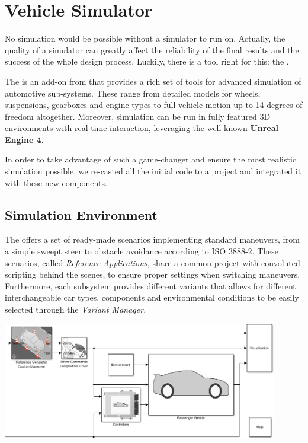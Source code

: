 
\chapter{Vehicle Simulator}

No simulation would be possible without a simulator to run on.
Actually, the quality of a simulator can greatly affect the reliability of the final results and the success of the whole design process.
Luckily, there is a tool right for this: the \textbf{\mwVDB\texttrademark}.

The \mwVDB{} is an add-on from \mwMW{} that provides a rich set of tools for advanced simulation of automotive sub-systems.
These range from detailed models for wheels, suspensions, gearboxes and engine types to full vehicle motion up to 14 degrees of freedom altogether.
Moreover, simulation can be run in fully featured 3D environments with real-time interaction, leveraging the well known \textbf{Unreal Engine 4}.

In order to take advantage of such a game-changer and ensure the most realistic simulation possible,
we re-casted all the initial code to a \mwSL{} project and integrated it with these new components.


	\section{Simulation Environment}

	The \mwVDB{} offers a set of ready-made scenarios implementing standard maneuvers, from a simple sweept steer to obstacle avoidance according to ISO 3888-2.
	These scenarios, called \emph{Reference Applications}, share a common \mwSL{} project with convoluted scripting behind the scenes, to ensure proper settings
	when switching maneuvers. Furthermore, each subsystem provides different variants that allows for different interchangeable car types, components and environmental
	conditions to be easily selected through the \emph{Variant Manager}.
	\begin{center}
		\includegraphics[width=0.9\textwidth]{Images/Simulator/sim-full}
	\end{center}


